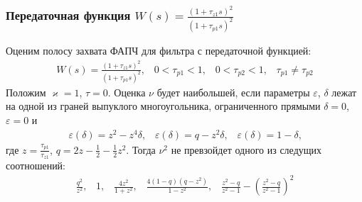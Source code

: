 \documentclass{beamer}
\begin{document}

\begin{frame}
\frametitle{Передаточная функция $W(s) = \frac{(1+\tau_{z1}s)^2}{(1+\tau_{p1}s)^2}$}
Оценим полосу захвата ФАПЧ для фильтра с передаточной функцией:
 \begin{align}\label{filter2}
W(s) = \frac{(1+\tau_{z1}s)^2}{(1+\tau_{p1}s)^2}\text{,} \quad0 < \tau_{p1} < 1 \text{,} \quad 0 < \tau_{p2} <1 \text{,} \quad \tau_{p1} \neq \tau_{p2}
 \end{align}
Положим $\varkappa = 1$, $\tau = 0$. Оценка $\nu$ будет наибольшей, если параметры $\varepsilon$, $\delta$ лежат на одной из граней выпуклого многоугольника, ограниченного прямыми $\delta = 0$, $\varepsilon = 0$ и \vspace{-3mm}
 \begin{equation*}
\begin{aligned}
\varepsilon(\delta)=z^2 - z^4\delta \text{,} \quad \varepsilon(\delta)=q - z^2\delta \text{,}
\quad \varepsilon(\delta)=1 - \delta \text{,}
\end{aligned}
\end{equation*}
где $z = \frac{\tau_{p1}}{\tau_{z1}}$, $q = 2z - \frac{1}{2} - \frac{1}{2}z^2$. 
Тогда $\nu^2$ не превзойдет одного из следущих соотношений:
\vspace{-2mm}
 \begin{equation}
\begin{aligned}
\frac{q^2}{z^2}\text{,} \quad 1 \text{,} \quad \frac{4z^2}{1+z^2} \text{,} \quad \frac{4(1-q)(q-z^2)}{1-z^2} \text{,} \quad \frac{z^2-q}{z^2-1} - \left(\frac{z^2-q}{z^2-1}\right)^2
\end{aligned}
\end{equation}
\end{frame}

\end{document}
